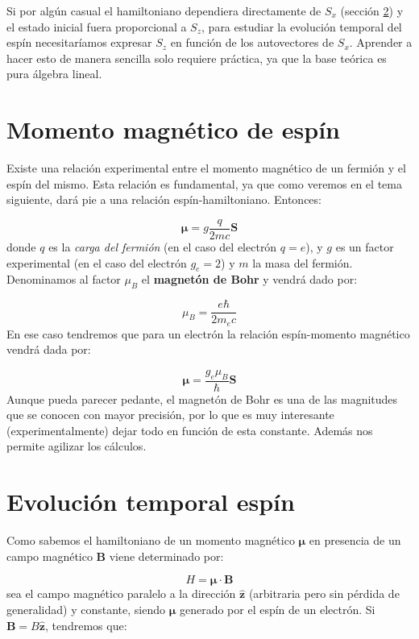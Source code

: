 \documentclass[12pt,a4paper]{book}
\numberwithin{equation}{chapter}
\numberwithin{figure}{chapter}
\newcommand{\zn}{\mathbf{z}}
\newcommand{\Bn}{\mathbf{B}}
\newcommand{\Sn}{\mathbf{S}}
\newcommand{\mun}{\boldsymbol{\mu}}
\newcommand{\hnz}{\hat{\zn}}
\begin{document}
Si por algún casual el hamiltoniano dependiera directamente de $S_x$ (sección \ref{Subsec:02.10}) y el estado inicial fuera proporcional a $S_z$, para estudiar la evolución temporal del espín necesitaríamos expresar $S_z$ en función de los autovectores de $S_x$. Aprender a hacer esto de manera sencilla solo requiere práctica, ya que la base teórica es pura álgebra lineal.  \\


\section{Momento magnético de espín}

Existe una relación experimental entre el momento magnético de un fermión y el espín del mismo. Esta relación es fundamental, ya que como veremos en el tema siguiente, dará pie a una relación espín-hamiltoniano. Entonces:

\begin{equation}
\mun = g \dfrac{q}{2 m c} \Sn
\end{equation}
donde $q$ es la \textit{carga del fermión} (en el caso del electrón $q=e$), y $g$ es un factor experimental (en el caso del electrón $g_e=2$) y $m$ la masa del fermión. Denominamos al factor $\mu_B$ el \textbf{magnetón de Bohr} y vendrá dado por:

\begin{equation}
\mu_B = \frac{e \hbar}{2 m_e c}
\end{equation}
En ese caso tendremos que para un electrón la relación espín-momento magnético vendrá dada por:

\begin{equation}
\mun = \frac{g_e \mu_B}{\hbar} \Sn
\end{equation}
Aunque pueda parecer pedante, el magnetón de Bohr es una de las magnitudes que se conocen con mayor precisión, por lo que es muy interesante (experimentalmente) dejar todo en función de esta constante. Además nos permite agilizar los cálculos. \\

\section{Evolución temporal espín} \label{Subsec:02.10}

Como sabemos el hamiltoniano de un momento magnético $\mun$ en presencia de un campo magnético $\Bn$ viene determinado por:

\begin{equation}
H = \mun \cdot \Bn
\end{equation}
sea el campo magnético paralelo a la dirección $\hnz$ (arbitraria pero sin pérdida de generalidad) y constante, siendo $\mun$ generado por el espín de un electrón. Si $\Bn = B \hnz$, tendremos que:
\end{document}
